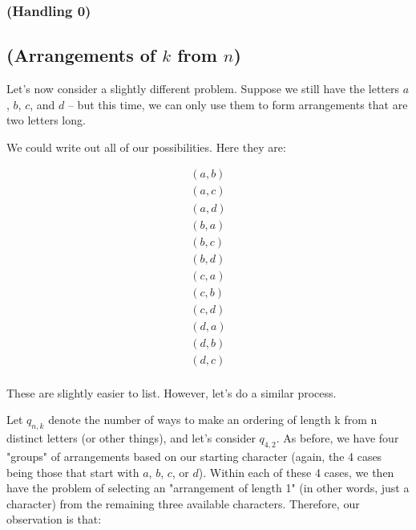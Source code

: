 


\subsubsection{(Handling 0)}



\subsection{(Arrangements of $k$ from $n$)}

Let's now consider a slightly different problem. Suppose we still have the letters $a$, $b$, $c$, and $d$ -- but this time, we can only use them to form arrangements that are two letters long.

We could write out all of our possibilities. Here they are:

\begin{gather*}
(a, b) \\
(a, c) \\
(a, d) \\
(b, a) \\
(b, c) \\
(b, d) \\
(c, a) \\
(c, b) \\
(c, d) \\
(d, a) \\
(d, b) \\
(d, c) \\
\end{gather*}

These are slightly easier to list. However, let's do a similar process.

Let $q_{n,k}$ denote the number of ways to make an ordering of length k from n distinct letters (or other things), and let's consider $q_{4,2}$. As before, we have four "groups" of arrangements based on our starting character (again, the 4 cases being those that start with $a$, $b$, $c$, or $d$). Within each of these 4 cases, we then have the problem of selecting an "arrangement of length 1" (in other words, just a character) from the remaining three available characters. Therefore, our observation is that:


